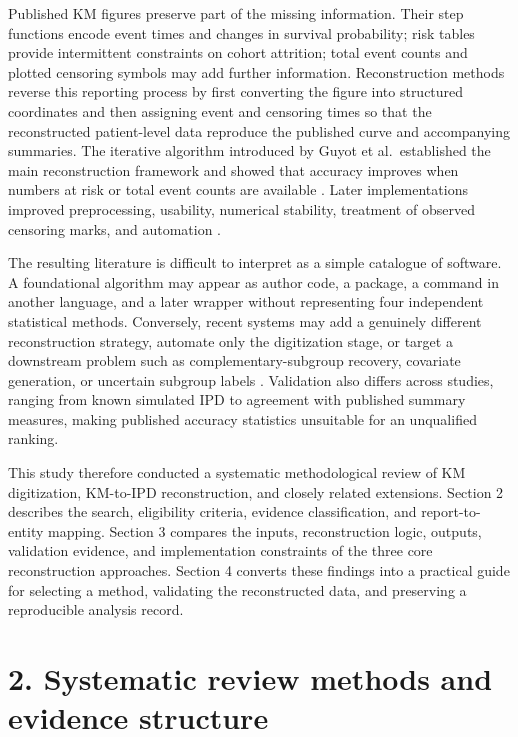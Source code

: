 \documentclass[10pt,letterpaper]{article}
\begin{document}
Published KM figures preserve part of the missing information. Their step functions encode event times and changes in survival probability; risk tables provide intermittent constraints on cohort attrition; total event counts and plotted censoring symbols may add further information. Reconstruction methods reverse this reporting process by first converting the figure into structured coordinates and then assigning event and censoring times so that the reconstructed patient-level data reproduce the published curve and accompanying summaries. The iterative algorithm introduced by Guyot et al.~established the main reconstruction framework and showed that accuracy improves when numbers at risk or total event counts are available \cite{guyot2012}. Later implementations improved preprocessing, usability, numerical stability, treatment of observed censoring marks, and automation \cite{wei2017,liu2021,rogula2022,zhang2024}.

The resulting literature is difficult to interpret as a simple catalogue of software. A foundational algorithm may appear as author code, a package, a command in another language, and a later wrapper without representing four independent statistical methods. Conversely, recent systems may add a genuinely different reconstruction strategy, automate only the digitization stage, or target a downstream problem such as complementary-subgroup recovery, covariate generation, or uncertain subgroup labels \cite{zhao2022,kmgpt2025,synthipd2026,resolve2026}. Validation also differs across studies, ranging from known simulated IPD to agreement with published summary measures, making published accuracy statistics unsuitable for an unqualified ranking.

This study therefore conducted a systematic methodological review of KM digitization, KM-to-IPD reconstruction, and closely related extensions. Section 2 describes the search, eligibility criteria, evidence classification, and report-to-entity mapping. Section 3 compares the inputs, reconstruction logic, outputs, validation evidence, and implementation constraints of the three core reconstruction approaches. Section 4 converts these findings into a practical guide for selecting a method, validating the reconstructed data, and preserving a reproducible analysis record.

\section*{2. Systematic review methods and evidence structure}
\end{document}
